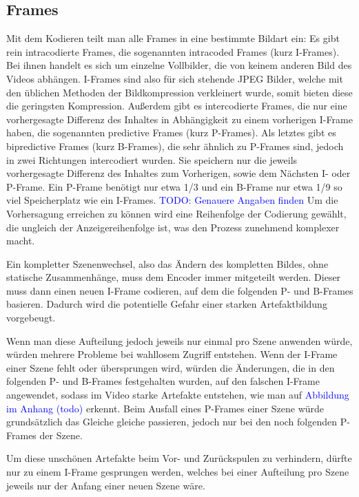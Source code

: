 \subsection{Frames}
Mit dem Kodieren teilt man alle Frames in eine bestimmte Bildart ein:
Es gibt rein intracodierte Frames, die sogenannten intracoded Frames (kurz I-Frames). Bei ihnen handelt es sich um einzelne Vollbilder, die von keinem anderen Bild des Videos abhängen. I-Frames sind also für sich stehende JPEG Bilder, welche mit den üblichen Methoden der Bildkompression verkleinert wurde, somit bieten diese die geringsten Kompression.
Außerdem gibt es intercodierte Frames, die nur eine vorhergesagte Differenz des Inhaltes in Abhängigkeit zu einem vorherigen I-Frame haben, die sogenannten predictive Frames (kurz P-Frames).
Als letztes gibt es bipredictive Frames (kurz B-Frames), die sehr ähnlich zu P-Frames sind, jedoch in zwei Richtungen intercodiert wurden. Sie speichern nur die jeweils vorhergesagte Differenz des Inhaltes zum Vorherigen, sowie dem Nächsten I- oder P-Frame.
Ein P-Frame benötigt nur etwa 1/3 und ein B-Frame nur etwa 1/9 so viel Speicherplatz wie ein I-Frames. \textcolor{blue}{TODO: Genauere Angaben finden}
Um die Vorhersagung erreichen zu können wird eine Reihenfolge der Codierung gewählt, die ungleich der Anzeigereihenfolge ist, was den Prozess zunehmend komplexer macht.\cite{symes_peter_digital_2004}

Ein kompletter Szenenwechsel, also das Ändern des kompletten Bildes, ohne statische Zusammenhänge, muss dem Encoder immer mitgeteilt werden. Dieser muss dann einen neuen I-Frame codieren, auf dem die folgenden P- und B-Frames basieren. Dadurch wird die potentielle Gefahr einer starken Artefaktbildung vorgebeugt.

Wenn man diese Aufteilung jedoch jeweils nur einmal pro Szene anwenden würde, würden mehrere Probleme bei wahllosem Zugriff entstehen. Wenn der I-Frame einer Szene fehlt oder übersprungen wird, würden die Änderungen, die in den folgenden P- und B-Frames festgehalten wurden, auf den falschen I-Frame angewendet, sodass im Video starke Artefakte entstehen, wie man auf \textcolor{blue}{Abbildung im Anhang (todo)} erkennt. Beim Ausfall eines P-Frames einer Szene würde grundsätzlich das Gleiche gleiche passieren, jedoch nur bei den noch folgenden P-Frames der Szene.

Um diese unschönen Artefakte beim Vor- und Zurückspulen zu verhindern, dürfte nur zu einem I-Frame gesprungen werden, welches bei einer Aufteilung pro Szene jeweils nur der Anfang einer neuen Szene wäre.

